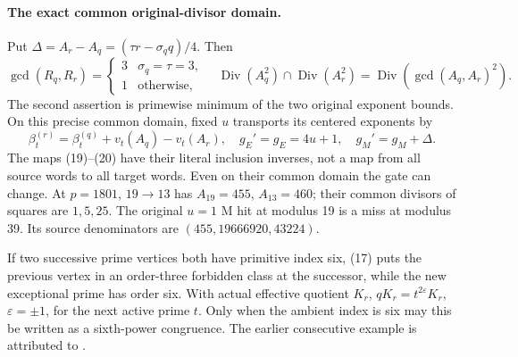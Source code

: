 \paragraph{The exact common original-divisor domain.}
Put $\Delta=A_r-A_q=(\tau r-\sigma_q q)/4$. Then
\[
 \gcd(R_q,R_r)=\begin{cases}3&\sigma_q=\tau=3,\\1&\text{otherwise},\end{cases}
 \quad
 \operatorname{Div}(A_q^2)\cap\operatorname{Div}(A_r^2)
 =\operatorname{Div}(\gcd(A_q,A_r)^2).                    \tag{19}
\]
The second assertion is primewise minimum of the two original exponent bounds.
On this precise common domain, fixed $u$ transports its centered exponents by
\[
 \beta_t^{(r)}=\beta_t^{(q)}+v_t(A_q)-v_t(A_r),
 \quad g_E'=g_E=4u+1,\quad g_M'=g_M+\Delta.              \tag{20}
\]
The maps (19)--(20) have their literal inclusion inverses, not a map from all
source words to all target words. Even on their common domain the gate can change.
At $p=1801$, $19\to13$ has $A_{19}=455$, $A_{13}=460$; their common divisors
of squares are $1,5,25$. The original $u=1$ M hit at modulus 19 is a miss at
modulus 39. Its source denominators are $(455,19666920,43224)$.

If two successive prime vertices both have primitive index six, (17) puts the
previous vertex in an order-three forbidden class at the successor, while the
new exceptional prime has order six. With actual effective quotient $K_r$,
$qK_r=t^{2\varepsilon}K_r$, $\varepsilon=\pm1$, for the next active prime $t$.
Only when the ambient index is six may this be written as a sixth-power congruence.
The earlier consecutive example is attributed to \cite[\S\S2--4]{BryanChain}.

